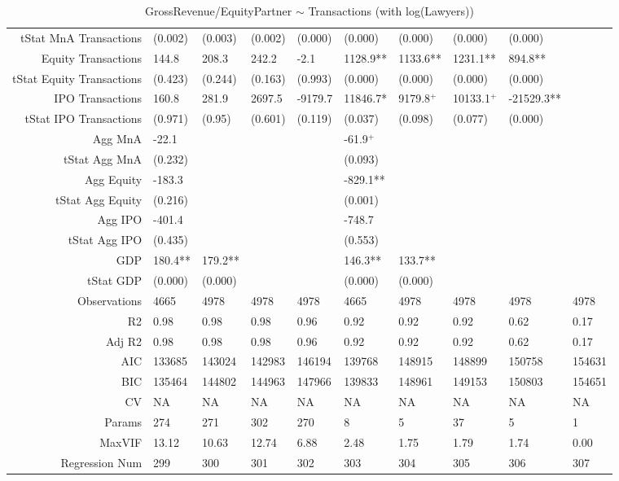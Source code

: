 \begin{table}[ht]
\begin{tabular}{rlllllllll}
  tStat MnA Transactions & (0.002) & (0.003) & (0.002) & (0.000) & (0.000) & (0.000) & (0.000) & (0.000) &  \\ 
  Equity Transactions & 144.8 & 208.3 & 242.2 & -2.1 & 1128.9** & 1133.6** & 1231.1** & 894.8** &  \\ 
  tStat Equity Transactions & (0.423) & (0.244) & (0.163) & (0.993) & (0.000) & (0.000) & (0.000) & (0.000) &  \\ 
  IPO Transactions & 160.8 & 281.9 & 2697.5 & -9179.7 & 11846.7* & 9179.8$^{+}$ & 10133.1$^{+}$ & -21529.3** &  \\ 
  tStat IPO Transactions & (0.971) & (0.95) & (0.601) & (0.119) & (0.037) & (0.098) & (0.077) & (0.000) &  \\ 
  Agg MnA & -22.1 &  &  &  & -61.9$^{+}$ &  &  &  &  \\ 
  tStat Agg MnA & (0.232) &  &  &  & (0.093) &  &  &  &  \\ 
  Agg Equity & -183.3 &  &  &  & -829.1** &  &  &  &  \\ 
  tStat Agg Equity & (0.216) &  &  &  & (0.001) &  &  &  &  \\ 
  Agg IPO & -401.4 &  &  &  & -748.7 &  &  &  &  \\ 
  tStat Agg IPO & (0.435) &  &  &  & (0.553) &  &  &  &  \\ 
  GDP & 180.4** & 179.2** &  &  & 146.3** & 133.7** &  &  &  \\ 
  tStat GDP & (0.000) & (0.000) &  &  & (0.000) & (0.000) &  &  &  \\ 
  Observations & 4665 & 4978 & 4978 & 4978 & 4665 & 4978 & 4978 & 4978 & 4978 \\ 
  R2 & 0.98 & 0.98 & 0.98 & 0.96 & 0.92 & 0.92 & 0.92 & 0.62 & 0.17 \\ 
  Adj R2 & 0.98 & 0.98 & 0.98 & 0.96 & 0.92 & 0.92 & 0.92 & 0.62 & 0.17 \\ 
  AIC & 133685 & 143024 & 142983 & 146194 & 139768 & 148915 & 148899 & 150758 & 154631 \\ 
  BIC & 135464 & 144802 & 144963 & 147966 & 139833 & 148961 & 149153 & 150803 & 154651 \\ 
  CV & NA & NA & NA & NA & NA & NA & NA & NA & NA \\ 
  Params & 274 & 271 & 302 & 270 & 8 & 5 & 37 & 5 & 1 \\ 
  MaxVIF & 13.12 & 10.63 & 12.74 & 6.88 & 2.48 & 1.75 & 1.79 & 1.74 & 0.00 \\ 
  Regression Num & 299 & 300 & 301 & 302 & 303 & 304 & 305 & 306 & 307 \\ 
   \hline
\end{tabular}
\caption{GrossRevenue/EquityPartner $\sim$ Transactions (with log(Lawyers))} 
\end{table}
